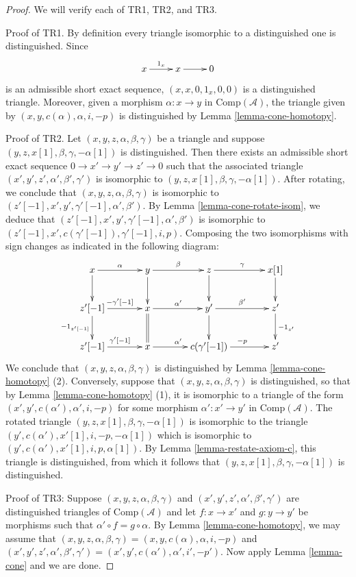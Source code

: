 \begin{proof}
We will verify each of TR1, TR2, and TR3. 

\medskip\noindent
Proof of TR1. By definition every triangle isomorphic to a distinguished
one is distinguished. Since
$$
\xymatrix{x\ar[r]^{1_x} & x\ar[r] & 0}
$$
is an admissible short exact sequence, $(x, x, 0, 1_x, 0, 0)$
is a distinguished triangle. Moreover, given a morphism
$\alpha : x \to y$ in $\text{Comp}(\mathcal{A})$, the triangle
given by $(x, y, c(\alpha), \alpha, i, -p)$ is distinguished by
Lemma \ref{lemma-cone-homotopy}.

\medskip\noindent
Proof of TR2. Let $(x,y,z,\alpha,\beta,\gamma)$ be a triangle and
suppose $(y,z,x[1],\beta,\gamma,-\alpha[1])$ is distinguished.
Then there exists an admissible short exact sequence
$0 \to x' \to y' \to z' \to 0$ such that the associated triangle
$(x',y',z',\alpha',\beta',\gamma')$ is isomorphic to
$(y,z,x[1],\beta,\gamma,-\alpha[1])$. After rotating, we conclude
that $(x,y,z,\alpha,\beta,\gamma)$ is isomorphic to
$(z'[-1],x',y', \gamma'[-1], \alpha',\beta')$. By
Lemma \ref{lemma-cone-rotate-isom},
we deduce that $(z'[-1],x',y', \gamma'[-1], \alpha',\beta')$ is
isomorphic to $(z'[-1],x',c(\gamma'[-1]), \gamma'[-1], i, p)$.
Composing the two isomorphisms with sign changes as indicated in
the following diagram:
$$
\xymatrix@C=3pc{
x\ar[r]^{\alpha}\ar[d] &
y\ar[r]^{\beta}\ar[d] &
z\ar[r]^{\gamma}\ar[d] &
x[1]\ar[d] \\
z'[-1]\ar[r]^{-\gamma'[-1]}\ar[d]_{-1_{z'[-1]}} &
x \ar[r]^{\alpha'}\ar@{=}[d] &
y' \ar[r]^{\beta'} \ar[d] &
z'\ar[d]^{-1_{z'}} \\
z'[-1]\ar[r]^{\gamma'[-1]} &
x \ar[r]^{\alpha'} &
c(\gamma'[-1]) \ar[r]^{-p} &
z'
}
$$
We conclude that $(x,y,z,\alpha,\beta,\gamma)$ is distinguished by
Lemma \ref{lemma-cone-homotopy} (2). Conversely, suppose that
$(x,y,z,\alpha,\beta,\gamma)$ is distinguished, so that by
Lemma \ref{lemma-cone-homotopy} (1), it is isomorphic to a
triangle of the form $(x',y', c(\alpha'), \alpha', i, -p)$
for some morphism $\alpha': x' \to y'$ in $\text{Comp}(\mathcal{A})$.
The rotated triangle $(y,z,x[1],\beta,\gamma, -\alpha[1])$ is
isomorphic to the triangle $(y',c(\alpha'), x'[1], i, -p, -\alpha[1])$
which is isomorphic to $(y',c(\alpha'), x'[1], i, p, \alpha[1])$.
By Lemma \ref{lemma-restate-axiom-c}, this triangle is distinguished,
from which it follows that $(y,z,x[1], \beta,\gamma, -\alpha[1])$
is distinguished.

\medskip\noindent
Proof of TR3: Suppose $(x,y,z, \alpha,\beta,\gamma)$ and
$(x',y',z',\alpha',\beta',\gamma')$ are distinguished triangles
of $\text{Comp}(\mathcal{A})$ and let $f: x \to x'$ and
$g: y \to y'$ be morphisms such that
$\alpha' \circ f = g \circ \alpha$. By
Lemma \ref{lemma-cone-homotopy}, we may assume that
$(x,y,z,\alpha,\beta,\gamma)= (x,y,c(\alpha),\alpha, i, -p)$
and $(x',y',z', \alpha',\beta',\gamma')= (x',y',c(\alpha'), \alpha',i',-p')$.
Now apply Lemma \ref{lemma-cone}
and we are done.
\end{proof}

